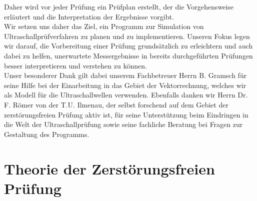 \documentclass[reducespace,stylepage,semiarbeit]{spezidoc}
\begin{document}
Daher wird vor jeder Prüfung ein Prüfplan erstellt, der die Vorgehensweise erläutert und die Interpretation der Ergebnisse vorgibt.\\
Wir setzen uns daher das Ziel, ein Programm zur Simulation von Ultraschallprüfverfahren zu planen und zu implementieren. Unseren Fokus legen wir darauf, die Vorbereitung einer Prüfung grundsätzlich zu erleichtern und auch dabei zu helfen, unerwartete Messergebnisse in bereits durchgeführten Prüfungen besser interpretieren und verstehen zu können.\\
Unser besonderer Dank gilt dabei unserem Fachbetreuer Herrn B. Gramsch für seine Hilfe bei der Einarbeitung in das Gebiet der Vektorrechnung, welches wir als Modell für die Ultraschallwellen verwenden. Ebenfalls danken wir Herrn Dr. F. Römer von der T.U. Ilmenau, der selbst forschend auf dem Gebiet der zerstörungsfreien Prüfung aktiv ist, für seine Unterstützung beim Eindringen in die Welt der Ultraschallprüfung sowie seine fachliche Beratung bei Fragen zur Gestaltung des Programms.

\newpage

\section{Theorie der Zerstörungsfreien Prüfung}
\end{document}
